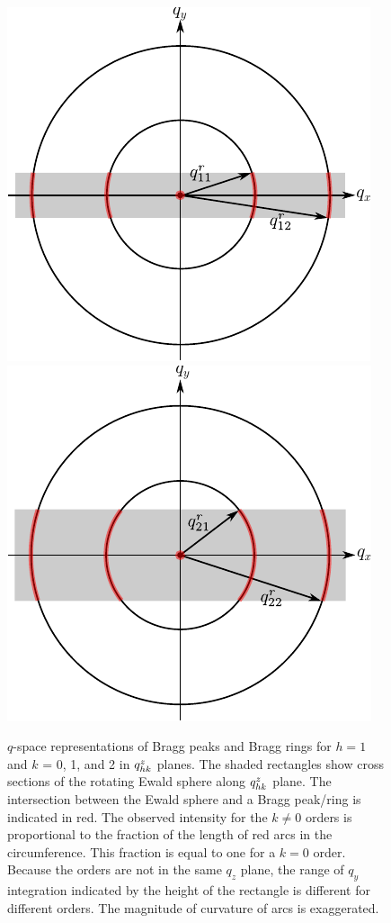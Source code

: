 \begin{figure}[htbp]
  \centering
  \includegraphics[scale=1]{figures/ripple/ewald_side_h1_ver1}
  \includegraphics[scale=1]{figures/ripple/ewald_side_h2_ver1}
  \caption{$q$-space representations of Bragg peaks and Bragg rings 
  for $h=1$ and $k$ = 0, 1, and 2 in $q_{hk}^z$ planes.
  The shaded rectangles show cross sections of the rotating Ewald sphere along
  $q_{hk}^z$ plane. The intersection between the Ewald sphere and 
  a Bragg peak/ring is indicated in red. 
  The observed intensity for the $k\neq 0$ orders is proportional to
  the fraction of the length of red arcs in the circumference. This 
  fraction is equal to one for a $k=0$ order.
  Because the orders are not in the same $q_z$ plane, the range of $q_y$ 
  integration indicated by the height of the rectangle is different for different
  orders. The magnitude of curvature of arcs is exaggerated.}
  \label{fig:ewald_side_h1}
\end{figure}

